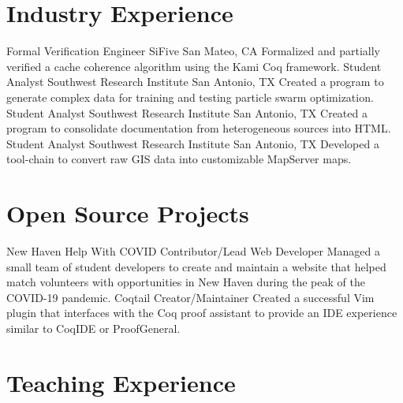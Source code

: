 \documentclass[10pt,letterpaper,sans]{moderncv}
\begin{document}
\section{Industry Experience}

        {Formal Verification Engineer}
        {SiFive}
        {San Mateo, CA}
        {}
        {%
          Formalized and partially verified a cache coherence algorithm using
          the Kami Coq framework.
        }
        {Student Analyst}
        {Southwest Research Institute}
        {San Antonio, TX}
        {}
        {%
          Created a program to generate complex data for training and testing
          particle swarm optimization.
        }
        {Student Analyst}
        {Southwest Research Institute}
        {San Antonio, TX}
        {}
        {%
          Created a program to consolidate documentation from heterogeneous
          sources into HTML\@.
        }
        {Student Analyst}
        {Southwest Research Institute}
        {San Antonio, TX}
        {}
        {%
          Developed a tool-chain to convert raw GIS data into customizable
          MapServer maps.
        }

\section{Open Source Projects}

        {New Haven Help With COVID}
        {Contributor/Lead Web Developer}
        {
        }
        {}
        {%
          Managed a small team of student developers to create and maintain a
          website that helped match volunteers with opportunities in New Haven
          during the peak of the COVID-19 pandemic.
        }
        {Coqtail}
        {Creator/Maintainer}
        {}
        {}
        {%
          Created a successful Vim plugin that interfaces with the Coq proof
          assistant to provide an IDE experience similar to CoqIDE or ProofGeneral.
        }

\section{Teaching Experience}
\end{document}
